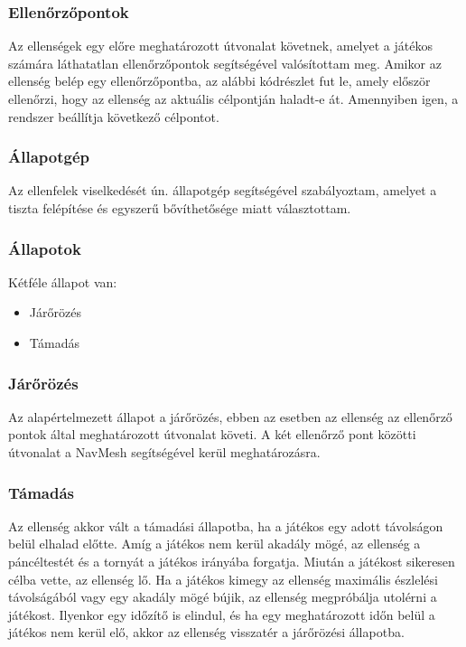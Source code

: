 \documentclass[
]{thesis-ekf}
\theoremstyle{definition}
\theoremstyle{remark}
\begin{document}
\subsubsection{Ellenőrzőpontok}

Az ellenségek egy előre meghatározott útvonalat követnek, amelyet a játékos számára láthatatlan ellenőrzőpontok segítségével valósítottam meg. Amikor az ellenség belép egy ellenőrzőpontba, az alábbi kódrészlet fut le, amely először ellenőrzi, hogy az ellenség az aktuális célpontján haladt-e át. Amennyiben igen, a rendszer beállítja következő célpontot.




\subsubsection{Állapotgép}

Az ellenfelek viselkedését ún. állapotgép segítségével szabályoztam, amelyet a tiszta felépítése és egyszerű bővíthetősége miatt választottam.



\subsubsection{Állapotok}

Kétféle állapot van:
\begin{itemize}
 \item Járőrözés
 \item Támadás
\end{itemize}

\subsubsection{Járőrözés}

Az alapértelmezett állapot a járőrözés, ebben az esetben az ellenség az ellenőrző pontok által meghatározott útvonalat követi. A két ellenőrző pont közötti útvonalat a NavMesh segítségével kerül meghatározásra.

\subsubsection{Támadás}

Az ellenség akkor vált a támadási állapotba, ha a játékos egy adott távolságon belül elhalad előtte. Amíg a játékos nem kerül akadály mögé, az ellenség a páncéltestét és a tornyát a játékos irányába forgatja. Miután a játékost sikeresen célba vette, az ellenség lő. Ha a játékos kimegy az ellenség maximális észlelési távolságából vagy egy akadály mögé bújik, az ellenség megpróbálja utolérni a játékost. Ilyenkor egy időzítő is elindul, és ha egy meghatározott időn belül a játékos nem kerül elő, akkor az ellenség visszatér a járőrözési állapotba.
\end{document}
